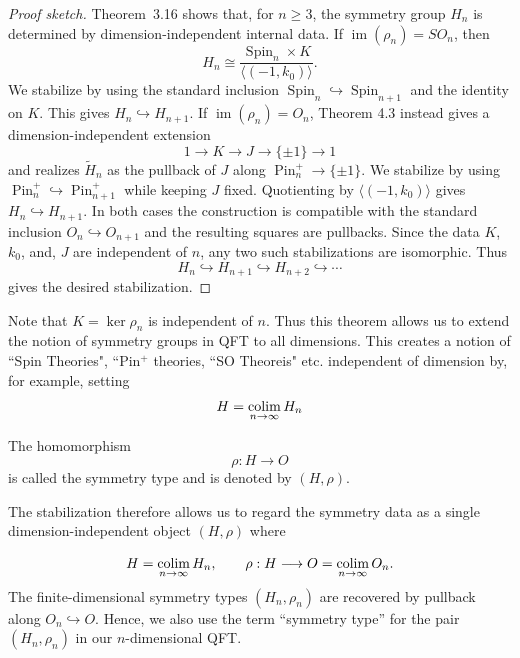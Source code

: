 \documentclass[a4paper,11pt]{article}
\begin{document}
\begin{proof}[Proof sketch]
    Theorem~3.16 shows that, for $n\geq3$, the symmetry group $H_n$ is determined by dimension-independent internal data. If $\operatorname{im}(\rho_n)=SO_n$, then
    \[
        H_n
        \cong
        \frac{\operatorname{Spin}_n\times K}
        {\langle(-1,k_0)\rangle}.
    \]
    We stabilize by using the standard inclusion $\operatorname{Spin}_n\hookrightarrow\operatorname{Spin}_{n+1}$ and the identity on $K$. This gives $H_n\hookrightarrow H_{n+1}.$ If $\operatorname{im}(\rho_n)=O_n$, Theorem 4.3 instead gives a dimension-independent extension
    \[
        1\to K\to J\to\{\pm1\}\to1
    \]
    and realizes $\widetilde H_n$ as the pullback of $J$ along $\operatorname{Pin}_n^+\to\{\pm1\}.$ We stabilize by using $\operatorname{Pin}_n^+
        \hookrightarrow
        \operatorname{Pin}_{n+1}^+$ while keeping $J$ fixed.  Quotienting by $\langle(-1,k_0)\rangle$ gives $H_n\hookrightarrow H_{n+1}.$ In both cases the construction is compatible with the standard inclusion $O_n\hookrightarrow O_{n+1}$ and the resulting squares are pullbacks. Since the data $K$, $k_0$, and, $J$ are independent of $n$, any two such stabilizations are isomorphic. Thus
    \[
        H_n\hookrightarrow H_{n+1}\hookrightarrow H_{n+2}
        \hookrightarrow\cdots
    \]
    gives the desired stabilization.
\end{proof}

Note that $K = \ker \rho_n$ is independent of $n$. Thus this theorem allows us to extend the notion of symmetry groups in QFT to all dimensions. This creates a notion of ``Spin Theories", ``Pin$^+$ theories, ``SO Theoreis" etc. independent of dimension by, for example, setting \[
H = \operatorname*{colim}_{n \to \infty} H_n
\]

\begin{definition}[Definition 3.27]
The homomorphism
\[
\rho : H \longrightarrow O
\]
is called the symmetry type and is denoted by $(H,\rho)$.
\end{definition}

The stabilization therefore allows us to regard the symmetry data as a single dimension-independent object $(H,\rho)$ where

\[H=\operatorname*{colim}_{n \to \infty}H_n,\qquad
    \rho:H\longrightarrow O=\operatorname*{colim}_{n \to \infty} O_n.
\]
The finite-dimensional symmetry types $(H_n,\rho_n)$ are recovered by pullback along $O_n\hookrightarrow O$. Hence, we also use the term ``symmetry type'' for the pair $(H_n,\rho_n)$ in our $n$-dimensional QFT.
\end{document}
